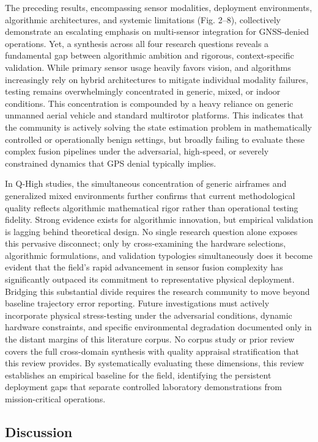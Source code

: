 \documentclass[conference]{IEEEtran}
\begin{document}
The preceding results, encompassing sensor modalities, deployment environments, algorithmic architectures, and systemic limitations (Fig. 2–8), collectively demonstrate an escalating emphasis on multi-sensor integration for GNSS-denied operations. Yet, a synthesis across all four research questions reveals a fundamental gap between algorithmic ambition and rigorous, context-specific validation. While primary sensor usage heavily favors vision, and algorithms increasingly rely on hybrid architectures to mitigate individual modality failures, testing remains overwhelmingly concentrated in generic, mixed, or indoor conditions. This concentration is compounded by a heavy reliance on generic unmanned aerial vehicle and standard multirotor platforms. This indicates that the community is actively solving the state estimation problem in mathematically controlled or operationally benign settings, but broadly failing to evaluate these complex fusion pipelines under the adversarial, high-speed, or severely constrained dynamics that GPS denial typically implies.


In Q-High studies, the simultaneous concentration of generic airframes and generalized mixed environments further confirms that current methodological quality reflects algorithmic mathematical rigor rather than operational testing fidelity. Strong evidence exists for algorithmic innovation, but empirical validation is lagging behind theoretical design. No single research question alone exposes this pervasive disconnect; only by cross-examining the hardware selections, algorithmic formulations, and validation typologies simultaneously does it become evident that the field's rapid advancement in sensor fusion complexity has significantly outpaced its commitment to representative physical deployment. Bridging this substantial divide requires the research community to move beyond baseline trajectory error reporting. Future investigations must actively incorporate physical stress-testing under the adversarial conditions, dynamic hardware constraints, and specific environmental degradation documented only in the distant margins of this literature corpus. No corpus study or prior review covers the full cross-domain synthesis with quality appraisal stratification that this review provides. By systematically evaluating these dimensions, this review establishes an empirical baseline for the field, identifying the persistent deployment gaps that separate controlled laboratory demonstrations from mission-critical operations.


\subsection{Discussion}
\end{document}
